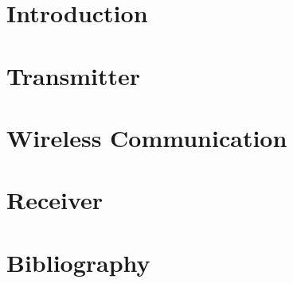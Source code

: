 \documentclass{article}
\begin{document}
	
	\newpage
	
	\tableofcontents
	\setcounter{page}{0}
	\newpage
	
	\section{Introduction}
	
	\newpage
	
	\section{Transmitter}
	
	\newpage
	
	\section{Wireless Communication}
	
	\newpage
	
	\section{Receiver}
	
	\newpage
	
	\section{Bibliography}
	
	\newpage
	
	
\end{document}
